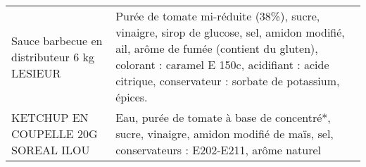 \begin{longtable}{p{5cm}p{10cm}}
                                                              Sauce barbecue en distributeur 6 kg LESIEUR &                                                                                                                                                                                                                                                                                                                                                                                                                                                                                                                                                                                                                                                                                                                                                                                                 Purée de tomate mi-réduite (38\%), sucre, vinaigre, sirop de glucose, sel, amidon modifié, ail, arôme de fumée (contient du gluten), colorant : caramel E 150c, acidifiant : acide citrique, conservateur : sorbate de potassium, épices. \\
                                                                      KETCHUP EN COUPELLE 20G SOREAL ILOU &                                                                                                                                                                                                                                                                                                                                                                                                                                                                                                                                                                                                                                                                                                                                                                                                                                                                                                        Eau, purée de tomate à base de concentré*, sucre, vinaigre, amidon modifié de maïs, sel, conservateurs : E202-E211, arôme naturel \\

\end{longtable}

